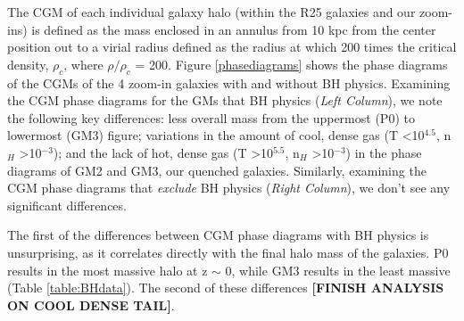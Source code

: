 \documentclass[]{emulateapj}
\begin{document}
The CGM of each individual galaxy halo (within the R25 galaxies and our zoom-ins) is defined as the mass enclosed in an annulus from 10 kpc from the center position out to a virial radius defined as the radius at which 200 times the critical density, $\rho_c$, where $\rho/\rho_c$ = 200. Figure \ref{phasediagrams} shows the phase diagrams of the CGMs of the 4 zoom-in galaxies with and without BH physics. Examining the CGM phase diagrams for the GMs that  BH physics (\textit{Left Column}), we note the following key differences: less overall mass from the uppermost (P0) to lowermost (GM3) figure; variations in the amount of cool, dense gas (T \textless 10$^{4.5}$, n$_H$ \textgreater 10$^{-3}$); and the lack of hot, dense gas (T \textgreater 10$^{5.5}$, n$_H$ \textgreater 10$^{-3}$) in the phase diagrams of GM2 and GM3, our quenched galaxies. Similarly, examining the CGM phase diagrams that \textit{exclude} BH physics (\textit{Right Column}), we don't see any significant differences. 

The first of the differences between CGM phase diagrams with BH physics is unsurprising, as it correlates directly with the final halo mass of the galaxies. P0 results in the most massive halo at z $\sim$ 0, while GM3 results in the least massive (Table \ref{table:BHdata}). The second of these differences \textbf{[FINISH ANALYSIS ON COOL DENSE TAIL]}.
\end{document}
